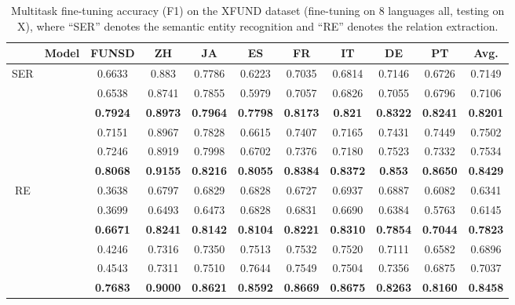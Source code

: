 \documentclass[11pt]{article}
\newcommand{\task}{\textsc{XFUND}\xspace}
\begin{document}
\begin{table*}[ht]
	\small
	\centering
	\begin{tabular}{c|lccccccccc}
		\toprule
& \multicolumn{1}{c}{\bf Model}      & \bf FUNSD & \bf ZH & \bf JA & \bf ES & \bf FR & \bf IT & \bf DE & \bf PT & \bf Avg. \\\midrule
		\multirow{6}{*}{SER} &   & 0.6633 & 0.883  & 0.7786 & 0.6223 & 0.7035 & 0.6814 & 0.7146 & 0.6726 & 0.7149 \\
		                    &       & 0.6538 & 0.8741 & 0.7855 & 0.5979 & 0.7057 & 0.6826 & 0.7055 & 0.6796 & 0.7106 \\
		                    &     & \bf 0.7924 & \bf 0.8973 & \bf 0.7964 & \bf 0.7798 & \bf 0.8173 & \bf 0.821  & \bf 0.8322 & \bf 0.8241 & \bf 0.8201 \\ \cmidrule{2-11}
		                    &  & 0.7151 & 0.8967 & 0.7828 & 0.6615 & 0.7407 & 0.7165 & 0.7431 & 0.7449 & 0.7502 \\
		                    &      & 0.7246 & 0.8919 & 0.7998 & 0.6702 & 0.7376 & 0.7180 & 0.7523 & 0.7332 & 0.7534 \\
		                    &    & \bf 0.8068 & \bf 0.9155 & \bf 0.8216 & \bf 0.8055 & \bf 0.8384 & \bf 0.8372 & \bf 0.853  & \bf 0.8650 & \bf 0.8429 \\\midrule
		\multirow{6}{*}{RE} &   &0.3638 & 0.6797 & 0.6829 & 0.6828 & 0.6727 & 0.6937 & 0.6887 & 0.6082 & 0.6341 \\
		                    &       & 0.3699 & 0.6493 & 0.6473 & 0.6828 & 0.6831 & 0.6690 & 0.6384 & 0.5763 & 0.6145\\
		                    &     & \bf 0.6671 & \bf 0.8241 & \bf 0.8142 & \bf 0.8104 & \bf 0.8221 & \bf 0.8310 & \bf 0.7854 & \bf 0.7044 & \bf 0.7823\\ \cmidrule{2-11}
		                    &  &0.4246 & 0.7316 & 0.7350 & 0.7513 & 0.7532 & 0.7520 & 0.7111 & 0.6582 & 0.6896\\
		                    &      & 0.4543 & 0.7311 & 0.7510 & 0.7644 & 0.7549 & 0.7504 & 0.7356 & 0.6875 & 0.7037 \\
		                    &    & \bf 0.7683 & \bf 0.9000 & \bf 0.8621 & \bf 0.8592 & \bf 0.8669 & \bf 0.8675 & \bf 0.8263 & \bf 0.8160 & \bf 0.8458 \\
		\bottomrule
	\end{tabular}
	\caption{Multitask fine-tuning accuracy (F1) on the \task dataset (fine-tuning on 8 languages all, testing on X), where ``SER'' denotes the semantic entity recognition and ``RE'' denotes the relation extraction.}
	\label{tab:all2x}
\end{table*}
\end{document}
